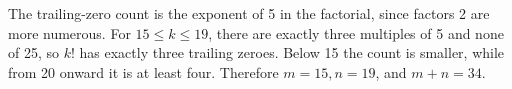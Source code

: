 The trailing-zero count is the exponent of 5 in the factorial, since factors 2 are more numerous. For $15\le k\le19$, there are exactly three multiples of 5 and none of 25, so $k!$ has exactly three trailing zeroes. Below 15 the count is smaller, while from 20 onward it is at least four. Therefore $m=15,n=19$, and $\boxed{m+n=34}$.
